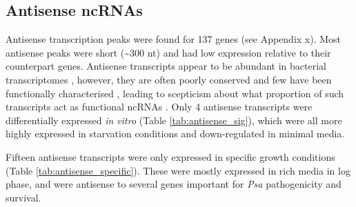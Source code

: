 
\subsection{Antisense ncRNAs}

Antisense transcription peaks were found for 137 genes (see Appendix x). Most antisense peaks were short (\textasciitilde300 nt) and had low expression relative to their counterpart genes. Antisense transcripts appear to be abundant in bacterial transcriptomes \citep{Georg2011-XXee}, however, they are often poorly conserved and few have been functionally characterised \citep{Cech2014-pxe}, leading to scepticism about what proportion of such transcripts act as functional ncRNAs \citep{Llorens-Rico2016-hvxx}.
Only 4 antisense transcripts were differentially expressed \textit{in vitro} (Table \ref{tab:antisense_sig}), which were all more highly expressed in starvation conditions and down-regulated in minimal media. 

Fifteen antisense transcripts were only expressed in specific growth conditions (Table \ref{tab:antisense_specific}). These were mostly expressed in rich media in log phase, and were antisense to several genes important for \textit{Psa} pathogenicity and survival. 

